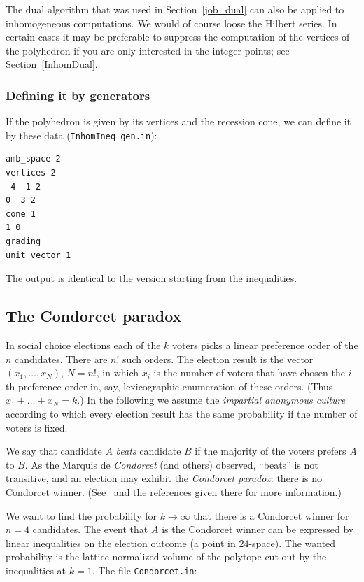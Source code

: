 The dual algorithm that was used in Section~\ref{job_dual} can also be applied to inhomogeneous computations. We would of course loose the Hilbert series. In certain cases it may be preferable to suppress the computation of the vertices of the polyhedron if you are only interested in the integer points; see Section~\ref{InhomDual}.

\subsubsection{Defining it by generators}\label{polyh_ex}

If the polyhedron is given by its vertices and the recession cone, we can define it by these data (\verb|InhomIneq_gen.in|):
\begin{Verbatim}
amb_space 2
vertices 2
-4 -1 2
0  3 2
cone 1
1 0
grading
unit_vector 1
\end{Verbatim}
The output is identical to the version starting from the inequalities.

\subsection{The Condorcet paradox}\label{Condorcet}

In social choice elections each of the $k$ voters picks a linear preference order of the $n$ candidates. There are $n!$ such orders. The election result is the vector $(x_1,\dots,x_N)$, $N=n!$, in which $x_i$ is the number of voters that have chosen the $i$-th preference order in, say, lexicographic enumeration of these orders. (Thus $x_1+\dots+x_N=k$.) In the following we assume the \emph{impartial anonymous culture} according to which every election result has the same probability if the number of voters is fixed.
\medskip

We say that candidate $A$ \emph{beats} candidate $B$ if the majority of the voters prefers $A$ to $B$. As the Marquis de \emph{Condorcet} (and others) observed, ``beats'' is not transitive, and an election may exhibit the \emph{Condorcet paradox}: there is no Condorcet winner. (See~\cite{BS} and the references given there for more information.)

We want to find the probability for $k\to\infty$ that there is a Condorcet winner for $n=4$ candidates. The event that $A$ is the Condorcet winner can be expressed by linear inequalities on the election outcome (a point in $24$-space). The wanted probability is the lattice normalized volume of the polytope cut out by the inequalities at $k=1$. The file \verb|Condorcet.in|:

